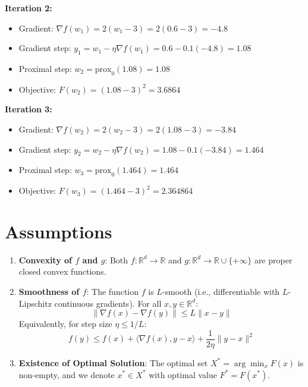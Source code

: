 \documentclass{article}
\begin{document}
\textbf{Iteration 2:}
\begin{itemize}
\item Gradient: $\nabla f(w_1) = 2(w_1 - 3) = 2(0.6 - 3) = -4.8$
\item Gradient step: $y_1 = w_1 - \eta \nabla f(w_1) = 0.6 - 0.1(-4.8) = 1.08$
\item Proximal step: $w_2 = \text{prox}_{0}(1.08) = 1.08$
\item Objective: $F(w_2) = (1.08 - 3)^2 = 3.6864$
\end{itemize}

\textbf{Iteration 3:}
\begin{itemize}
\item Gradient: $\nabla f(w_2) = 2(w_2 - 3) = 2(1.08 - 3) = -3.84$
\item Gradient step: $y_2 = w_2 - \eta \nabla f(w_2) = 1.08 - 0.1(-3.84) = 1.464$
\item Proximal step: $w_3 = \text{prox}_{0}(1.464) = 1.464$
\item Objective: $F(w_3) = (1.464 - 3)^2 = 2.364864$
\end{itemize}

\section*{Assumptions}
\begin{enumerate}
\item \textbf{Convexity of $f$ and $g$}: Both $f: \mathbb{R}^d \to \mathbb{R}$ and $g: \mathbb{R}^d \to \mathbb{R} \cup \{+\infty\}$ are proper closed convex functions.
\item \textbf{Smoothness of $f$}: The function $f$ is $L$-smooth (i.e., differentiable with $L$-Lipschitz continuous gradients). For all $x, y \in \mathbb{R}^d$:
\begin{equation}
\|\nabla f(x) - \nabla f(y)\| \leq L \|x - y\|
\end{equation}
Equivalently, for step size $\eta \leq 1/L$:
\begin{equation}
f(y) \leq f(x) + \langle \nabla f(x), y - x \rangle + \frac{1}{2\eta} \|y - x\|^2
\end{equation}
\item \textbf{Existence of Optimal Solution}: The optimal set $X^* = \arg\min_x F(x)$ is non-empty, and we denote $x^* \in X^*$ with optimal value $F^* = F(x^*)$.
\end{enumerate}
\end{document}
